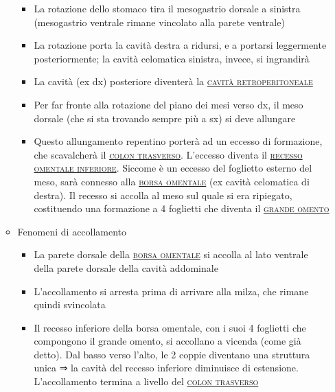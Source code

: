 \documentclass[italian,]{article}
\providecommand{\tightlist}{%
  \setlength{\itemsep}{0pt}\setlength{\parskip}{0pt}}
\renewcommand{\a}[1]{\underline{\textsc{#1}}}
\begin{document}
\begin{enumerate}
\begin{itemize}
    \begin{itemize}
    \tightlist
    \item
      La rotazione dello stomaco tira il mesogastrio dorsale a sinistra
      (mesogastrio ventrale rimane vincolato alla parete ventrale)
    \item
      La rotazione porta la cavità destra a ridursi, e a portarsi
      leggermente posteriormente; la cavità celomatica sinistra, invece,
      si ingrandirà
    \item
      La cavità (ex dx) posteriore diventerà la
      \a{cavità retroperitoneale}
    \item
      Per far fronte alla rotazione del piano dei mesi verso dx, il meso
      dorsale (che si sta trovando sempre più a sx) si deve allungare
    \item
      Questo allungamento repentino porterà ad un eccesso di formazione,
      che scavalcherà il \a{colon trasverso}. L'eccesso diventa il
      \a{recesso omentale inferiore}. Siccome è un eccesso del foglietto
      esterno del meso, sarà connesso alla \a{borsa omentale} (ex cavità
      celomatica di destra). Il recesso si accolla al meso sul quale si
      era ripiegato, costituendo una formazione a 4 foglietti che
      diventa il \a{grande omento}
    \end{itemize}
  \item
    Fenomeni di accollamento

    \begin{itemize}
    \tightlist
    \item
      La parete dorsale della \a{borsa omentale} si accolla al lato
      ventrale della parete dorsale della cavità addominale
    \item
      L'accollamento si arresta prima di arrivare alla milza, che rimane
      quindi svincolata
    \item
      Il recesso inferiore della borsa omentale, con i suoi 4 foglietti
      che compongono il grande omento, si accollano a vicenda (come già
      detto). Dal basso verso l'alto, le 2 coppie diventano una
      struttura unica ⇒ la cavità del recesso inferiore diminuisce di
      estensione. L'accollamento termina a livello del
      \a{colon trasverso}


\end{itemize}
\end{itemize}
\end{enumerate}
\end{document}
